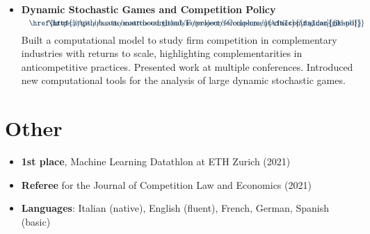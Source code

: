 \documentclass[a4paper]{mctemplate} %
\begin{document}
\begin{main}
\begin{itemize}
    \item \textbf{Dynamic Stochastic Games and Competition Policy}
    \hfill
    {$
    \begin{array}{c}
    \begin{tikzpicture}
        \node[scale=1, maincolor] at (0,0){\href{https://github.com/matteocourthoud/Foreclosure-Complementarities}{\faIcon{github}}};
        \node[scale=1, maincolor] at (.5,0){\href{https://matteocourthoud.github.io/project/foreclosure/}{\faIcon[regular]{file-pdf}}};
    \end{tikzpicture}
    \end{array}
    $}
    \newline
    {Built a computational model to study firm competition in complementary industries with returns to scale, highlighting complementarities in anticompetitive practices. Presented work at multiple conferences. Introduced new computational tools for the analysis of large dynamic stochastic games.
    }
    \vspace{.3cm}
\end{itemize}

        
        
\section{Other}
\vspace{-.2cm}
\begin{itemize}
    \item \textbf{1st place}, Machine Learning Datathlon at ETH Zurich (2021)
    \item \textbf{Referee} for the Journal of Competition Law and Economics (2021)
    \item \textbf{Languages}: Italian (native), English (fluent), French, German, Spanish (basic)
\end{itemize}

\end{main}
\end{document}
